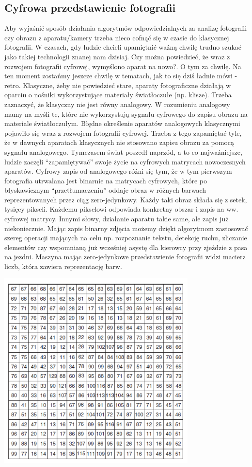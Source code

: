 \documentclass{article}
\begin{document}
\subsection{Cyfrowa przedstawienie fotografii}
Aby wyjaśnić sposób działania algorytmów odpowiedzialnych za analizę fotografii czy obrazu z aparatu/kamery trzeba nieco cofnąć się w czasie do klasycznej fotografii.
W czasach, gdy ludzie chcieli upamiętnić ważną chwilę trudno szukać jako takiej technologii znanej nam dzisiaj. Czy można powiedzieć, że wraz z rozwojem fotografii cyfrowej, wymyślono aparat na nowo?. O tym za chwilę. Na ten moment zostańmy jeszcze chwilę w tematach, jak to się dziś ładnie mówi - retro. Klasyczne, żeby nie powiedzieć stare, aparaty fotograficzne działają w oparciu o nośniki wykorzystujące materiały światłoczułe (np. klisze). Trzeba zaznaczyć, że klasyczny nie jest równy analogowy. W rozumieniu analogowy mamy na myśli te, które nie wykorzystują sygnału cyfrowego do zapisu obrazu na materiale światłoczułym. Błędne określenie aparatów analogowych klasycznymi pojawiło się wraz z rozwojem fotografii cyfrowej. Trzeba z tego zapamiętać tyle, że w dawnych aparatach klasycznych nie stosowano zapisu obrazu za pomocą sygnału analogowego. Tymczasem świat poszedł naprzód, a to co najważniejsze, ludzie zaczęli “zapamiętywać” swoje życie na cyfrowych matrycach nowoczesnych aparatów. Cyfrowy zapis od analogowego różni się tym, że w tym pierwszym fotografia utrwalana jest binarnie na matrycach cyfrowych, które po błyskawicznym “przetłumaczeniu” oddaje obraz w różnych barwach reprezentowanych przez ciąg zero-jedynkowy. Każdy taki obraz składa się z setek, tysięcy pikseli. Każdemu pikselowi odpowiada konkretny obszar i zapis na ww. cyfrowej matrycy. Innymi słowy, działanie aparatu takie same, ale zapis już niekoniecznie. Mając zapis binarny zdjęcia możemy dzięki algorytmom zastosować szereg operacji mających na celu np. rozpoznanie tekstu, detekcję ruchu, zliczanie elementów czy wspomnianą już wcześniej asystę dla kierowcy przy zjeździe z pasa na jezdni. Maszyna mając zero-jedynkowe przedstawienie fotografii widzi macierz liczb, która zawiera reprezentację barw.
\begin{center}
\includegraphics[width=10cm]{macierz}
\end{center}
\end{document}
